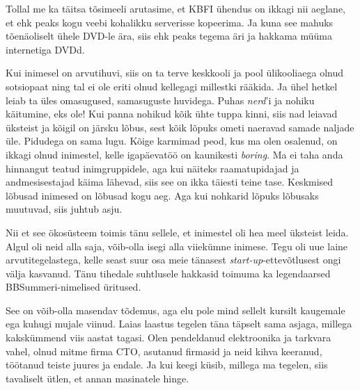 Tollal me ka täitsa tõsimeeli arutasime, 
et KBFI ühendus on ikkagi nii aeglane, et ehk peaks kogu 
veebi kohalikku serverisse kopeerima. Ja 
kuna see mahuks tõenäoliselt ühele DVD-le ära, siis ehk peaks tegema 
äri ja hakkama müüma internetiga DVDd. 


Kui inimesel on arvutihuvi, siis on ta
terve keskkooli ja pool ülikooliaega olnud sotsiopaat ning tal ei ole eriti 
olnud kellegagi millestki rääkida. Ja ühel hetkel leiab ta üles omasugused, 
samasuguste huvidega. Puhas \emph{nerd}'i ja nohiku käitumine, eks ole! 
Kui panna nohikud kõik ühte tuppa kinni, siis nad leiavad 
üksteist ja kõigil on järsku lõbus, sest kõik lõpuks ometi naeravad samade 
naljade üle. Pidudega on sama lugu. Kõige karmimad peod, kus ma 
olen osalenud, on ikkagi olnud inimestel, kelle igapäevatöö on kaunikesti 
\emph{boring}. Ma ei taha anda hinnangut teatud inimgruppidele, aga kui näiteks
 raamatupidajad ja andmesisestajad käima lähevad, siis see on 
ikka täiesti teine tase. Keskmised lõbusad inimesed on lõbusad 
kogu aeg. Aga kui nohkarid lõpuks lõbusaks muutuvad, siis juhtub asju.

Nii et see ökosüsteem toimis tänu sellele, et inimestel oli hea meel üksteist 
leida. 
Algul oli neid alla saja, 
võib-olla isegi alla viie{\-}kümne inimese. Tegu oli uue 
laine arvutitegelastega, kelle seast suur osa meie tänasest 
\emph{start-up}-ettevõtlusest 
ongi välja kasvanud. Tänu tihedale suhtlusele hakkasid 
toimuma ka legendaarsed BBSummeri-nimelised üritused. 


See on võib-olla masendav tõdemus, aga elu pole mind sellelt kursilt
kaugemale ega kuhugi mujale viinud. Laias laastus 
tegelen täna täpselt sama asjaga, millega kakskümmend viis aastat 
tagasi. Olen pendeldanud elektroonika ja tarkvara vahel, 
olnud mitme firma CTO, asutanud firmasid ja neid kihva keeranud, töötanud 
teiste juures ja endale. Ja kui keegi küsib, millega ma tegelen, 
siis tavaliselt ütlen, et annan masinatele hinge. 



